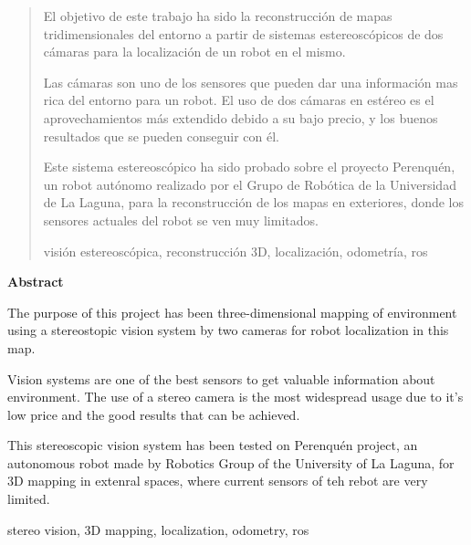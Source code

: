 \documentclass[spanish,a4paper,14pt,oneside]{extreport}
\newenvironment{summary}
{\par\noindent\begin{center}\textbf{Abstract}\end{center}\begin{itshape}\par\noindent}
{\end{itshape}}
\newenvironment{keywords}
{\begin{list}{}{\setlength{\leftmargin}{1em}}\item[\hskip\labelsep \bfseries Keywords:]}
{\end{list}}
\newenvironment{palabrasClave}
{\begin{list}{}{\setlength{\leftmargin}{1em}}\item[\hskip\labelsep \bfseries Palabras clave:]}
{\end{list}}
\begin{document}
\newpage  %
\begin{abstract}
{\em

El objetivo de este trabajo ha sido la reconstrucción de mapas tridimensionales
del entorno a partir de sistemas estereoscópicos de dos cámaras para la
localización de un robot en el mismo.

\bigskip
Las cámaras son uno de los sensores que pueden dar una información mas rica del
entorno para un robot. El uso de dos cámaras en estéreo es el aprovechamientos
más extendido debido a su bajo precio, y los buenos resultados que se pueden
conseguir con él.

\bigskip
Este sistema estereoscópico ha sido probado sobre el proyecto Perenquén, un
robot autónomo realizado por el Grupo de Robótica de la Universidad de La
Laguna, para la reconstrucción de los mapas en exteriores, donde los sensores
actuales del robot se ven muy limitados.
}

\begin{palabrasClave}
visión estereoscópica, reconstrucción 3D, localización, odometría, ros
\end{palabrasClave}

\end{abstract}

\newpage  %
\begin{summary}
{\em

The purpose of this project has been three-dimensional mapping of environment
using a stereostopic vision system by two cameras for robot localization in this
map.

\bigskip
Vision systems are one of the best sensors to get valuable information about
environment. The use of a stereo camera is the most widespread usage due to it's
low price and the good results that can be achieved.

\bigskip
This stereoscopic vision system has been tested on Perenquén project, an
autonomous robot made by Robotics Group of the University of La Laguna, for 3D
mapping in extenral spaces, where current sensors of teh rebot are very limited.
}

\begin{keywords}
stereo vision, 3D mapping, localization, odometry, ros
\end{keywords}

\end{summary}
\end{document}
